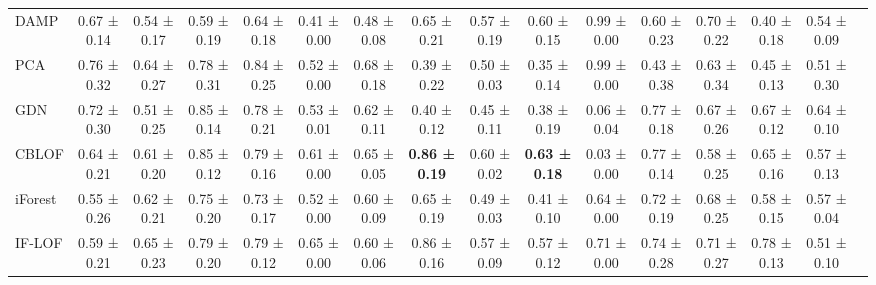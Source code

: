 \begin{tabular}{lccccccccccccccc}
DAMP & 0.67 ± 0.14 & 0.54 ± 0.17 & 0.59 ± 0.19 & 0.64 ± 0.18 & 0.41 ± 0.00 & 0.48 ± 0.08 & 0.65 ± 0.21 & 0.57 ± 0.19 & 0.60 ± 0.15 & 0.99 ± 0.00 & 0.60 ± 0.23 & 0.70 ± 0.22 & 0.40 ± 0.18 & 0.54 ± 0.09 \\
PCA & 0.76 ± 0.32 & 0.64 ± 0.27 & 0.78 ± 0.31 & 0.84 ± 0.25 & 0.52 ± 0.00 & 0.68 ± 0.18 & 0.39 ± 0.22 & 0.50 ± 0.03 & 0.35 ± 0.14 & 0.99 ± 0.00 & 0.43 ± 0.38 & 0.63 ± 0.34 & 0.45 ± 0.13 & 0.51 ± 0.30 \\
GDN & 0.72 ± 0.30 & 0.51 ± 0.25 & 0.85 ± 0.14 & 0.78 ± 0.21 & 0.53 ± 0.01 & 0.62 ± 0.11 & 0.40 ± 0.12 & 0.45 ± 0.11 & 0.38 ± 0.19 & 0.06 ± 0.04 & 0.77 ± 0.18 & 0.67 ± 0.26 & 0.67 ± 0.12 & 0.64 ± 0.10 \\
CBLOF & 0.64 ± 0.21 & 0.61 ± 0.20 & 0.85 ± 0.12 & 0.79 ± 0.16 & 0.61 ± 0.00 & 0.65 ± 0.05 & \bfseries 0.86 ± 0.19 & 0.60 ± 0.02 & \bfseries 0.63 ± 0.18 & 0.03 ± 0.00 & 0.77 ± 0.14 & 0.58 ± 0.25 & 0.65 ± 0.16 & 0.57 ± 0.13 \\
iForest & 0.55 ± 0.26 & 0.62 ± 0.21 & 0.75 ± 0.20 & 0.73 ± 0.17 & 0.52 ± 0.00 & 0.60 ± 0.09 & 0.65 ± 0.19 & 0.49 ± 0.03 & 0.41 ± 0.10 & 0.64 ± 0.00 & 0.72 ± 0.19 & 0.68 ± 0.25 & 0.58 ± 0.15 & 0.57 ± 0.04 \\
IF-LOF & 0.59 ± 0.21 & 0.65 ± 0.23 & 0.79 ± 0.20 & 0.79 ± 0.12 & 0.65 ± 0.00 & 0.60 ± 0.06 & 0.86 ± 0.16 & 0.57 ± 0.09 & 0.57 ± 0.12 & 0.71 ± 0.00 & 0.74 ± 0.28 & 0.71 ± 0.27 & 0.78 ± 0.13 & 0.51 ± 0.10 \\
\bottomrule
\end{tabular}
